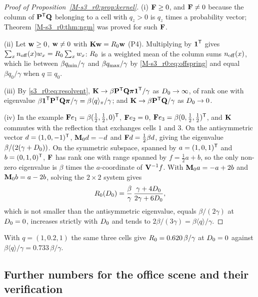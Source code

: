 \begin{proof}[Proof of Proposition~\ref{M-s3_r0:prop:kernel}]
  (i) $\mathbf{F}\ge0$, and $\mathbf{F}\ne0$ because the column of $\mathbf{P}^{\mathsf{T}}\mathbf{Q}$ belonging to a cell with $q_z>0$ is $q_z$
  times a probability vector; Theorem~\ref{M-s3_r0:thm:ngm} was proved for such $\mathbf{F}$.

  (ii) Let $\mathbf{w}\ge0$, $\mathbf{w}\ne0$ with $\mathbf{K}\mathbf{w}=R_0\mathbf{w}$ (P4).  Multiplying by $\boldsymbol{1}^{\mathsf{T}}$ gives
  $\sum_xn_{\mathrm{off}}(x)w_x=R_0\sum_xw_x$: $R_0$ is a weighted mean of the column sums $n_{\mathrm{off}}(x)$, which lie between
  $\beta q_{\min}/\gamma$ and $\beta q_{\max}/\gamma$ by \eqref{M-s3_r0:eq:offspring} and equal $\beta q_0/\gamma$ when
  $q\equiv q_0$.

  (iii) By \eqref{s3_r0:eq:resolvent}, $\mathbf{K}\to\beta\mathbf{P}^{\mathsf{T}}\mathbf{Q}\boldsymbol{\pi}\boldsymbol{1}^{\mathsf{T}}/\gamma$ as $D_0\to\infty$, of
  rank one with eigenvalue $\beta\boldsymbol{1}^{\mathsf{T}}\mathbf{P}^{\mathsf{T}}\mathbf{Q}\boldsymbol{\pi}/\gamma=\beta\langle q\rangle_{\pi}/\gamma$; and
  $\mathbf{K}\to\beta\mathbf{P}^{\mathsf{T}}\mathbf{Q}/\gamma$ as $D_0\to0$.

  (iv) In the example $\mathbf{F} e_1=\beta(\tfrac12,\tfrac12,0)^{\mathsf{T}}$, $\mathbf{F} e_2=0$,
  $\mathbf{F} e_3=\beta(0,\tfrac12,\tfrac12)^{\mathsf{T}}$, and $\mathbf{K}$ commutes with the reflection that exchanges cells $1$
  and $3$.  On the antisymmetric vector $d=(1,0,-1)^{\mathsf{T}}$, $\mathbf{M}_0 d=-d$ and $\mathbf{F} d=\tfrac12\beta d$, giving the
  eigenvalue $\beta/(2(\gamma+D_0))$.  On the symmetric subspace, spanned by $a=(1,0,1)^{\mathsf{T}}$ and
  $b=(0,1,0)^{\mathsf{T}}$, $\mathbf{F}$ has rank one with range spanned by $f=\tfrac12a+b$, so the only non-zero eigenvalue
  is $\beta$ times the $a$-coordinate of $\mathbf{V}^{-1}f$.  With $\mathbf{M}_0 a=-a+2b$ and $\mathbf{M}_0 b=a-2b$, solving the
  $2\times2$ system gives
  \[
     R_0(D_0)=\frac{\beta}{\gamma}\,\frac{\gamma+4D_0}{2\gamma+6D_0},
  \]
  which is not smaller than the antisymmetric eigenvalue, equals $\beta/(2\gamma)$ at $D_0=0$, increases strictly with
  $D_0$ and tends to $2\beta/(3\gamma)=\beta\langle q\rangle/\gamma$.
\end{proof}

With $q=(1,0.2,1)$ the same
three cells give $R_0=0.620\,\beta/\gamma$ at $D_0=0$ against $\beta\langle q\rangle/\gamma=0.733\,\beta/\gamma$.

\subsection{Further numbers for the office scene and their verification}\label{appS_r0:sec:numbers}

